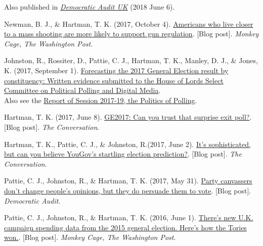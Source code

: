 \documentclass[12pt]{article}
\begin{document}
\begin{bibenum}
Also published in 
\href{http://www.democraticaudit.com/2018/06/06/general-election-polling-goes-geographical-the-accuracy-and-value-of-constituency-level-estimates/}{\textit{Democratic Audit UK}} (2018 June 6). 

\item Newman, B. J., \& Hartman, T. K. (2017, October 4). 
\href{https://www.washingtonpost.com/news/monkey-cage/wp/2017/10/03/americans-who-live-closer-to-a-mass-shooting-are-more-likely-to-support-gun-regulation/}{Americans who live closer to a mass shooting are more likely to support gun regulation}. [Blog post].
    \textit{Monkey Cage, The Washington Post}.  

\item Johnston, R., Rossiter, D., Pattie, C. J., {Hartman, T. K.}, Manley, D. J., \& Jones, K. (2017, September 1).
\href{https://www.parliament.uk/documents/lords-committees/political-polling-digital-media/Political-Polling-and-Digital-Media-Committee-Oral-and-Written-Evidence.pdf}
{Forecasting the 2017 General Election result by constituency: Written evidence submitted to the House of Lords Select Committee on Political Polling and Digital Media}.\\
Also see the \href{https://publications.parliament.uk/pa/ld201719/ldselect/ldppdm/106/106.pdf}
{Report of Session 2017-19, the Politics of Polling}.

        \item Hartman, T. K. (2017, June 8). 
    \href{https://theconversation.com/ge2017-can-you-trust-that-surprise-exit-poll-79170}
    {GE2017: Can you trust that surprise exit poll?}. [Blog post]. 
    \textit{The Conversation}.

    \item Hartman, T. K., Pattie, C. J., \& Johnston, R.(2017, June 2). 
    \href{https://theconversation.com/its-sophisticated-but-can-you-believe-yougovs-startling-election-prediction-78701}
    {It's sophisticated, but can you believe YouGov's startling election prediction?}. [Blog post]. 
    \textit{The Conversation}.

	\item Pattie, C. J., Johnston, R., \& Hartman, T. K. (2017, May 31). 
	\href{http://www.democraticaudit.com/2017/05/31/party-canvassers-dont-change-peoples-opinions-but-they-do-persuade-them-to-vote/}{Party canvassers don't change people's opinions, but they do persuade them to vote}. [Blog post]. \textit{Democratic Audit}. 

    \item Pattie, C. J., Johnston, R., \& Hartman, T. K. (2016, June 1). 
    \href{https://www.washingtonpost.com/news/monkey-cage/wp/2016/06/01/theres-new-u-k-campaign-spending-data-from-the-2015-general-election-heres-how-the-tories-won/}
    {There's new U.K. campaign spending data from the 2015 general election. Here's how the Tories won.}. [Blog post]. 
    \textit{Monkey Cage, The Washington Post}.   


\end{bibenum}
\end{document}
